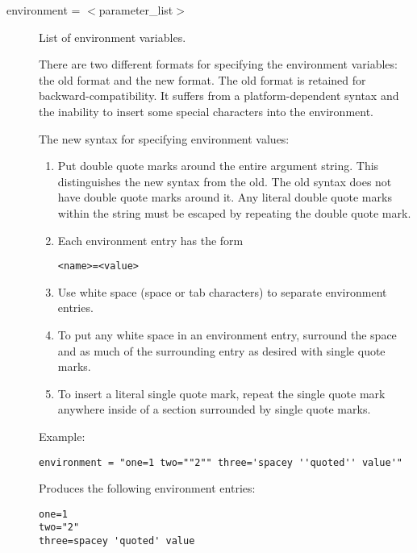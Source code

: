 \begin{description}
\label{man-condor-submit-environment}
\item[environment = $<$parameter\_list$>$] 
List of environment
variables.

There are two different formats for specifying the environment
variables: the old format and the new format.  The old format is
retained for backward-compatibility.  It suffers from a
platform-dependent syntax and the inability to insert some special
characters into the environment.

The new syntax for specifying environment values:

\begin{enumerate}

\item Put double quote marks around the entire argument string.  This
distinguishes the new syntax from the old.
The old syntax does not have double quote marks around it.
Any literal double quote marks within the string
must be escaped by repeating the double quote mark.

\item Each environment entry has the form

\begin{verbatim}
<name>=<value>
\end{verbatim}

\item Use white space (space or tab characters) to separate environment entries.

\item To put any white space in an environment entry, surround
the space and as much of the surrounding entry as desired with
single quote marks.

\item To insert a literal single quote mark, repeat the single quote mark
anywhere inside of a section surrounded by single quote marks.

\end{enumerate}

Example:

\begin{verbatim}
environment = "one=1 two=""2"" three='spacey ''quoted'' value'"
\end{verbatim}

Produces the following environment entries:

\begin{verbatim}
one=1
two="2"
three=spacey 'quoted' value
\end{verbatim}


\end{description}
